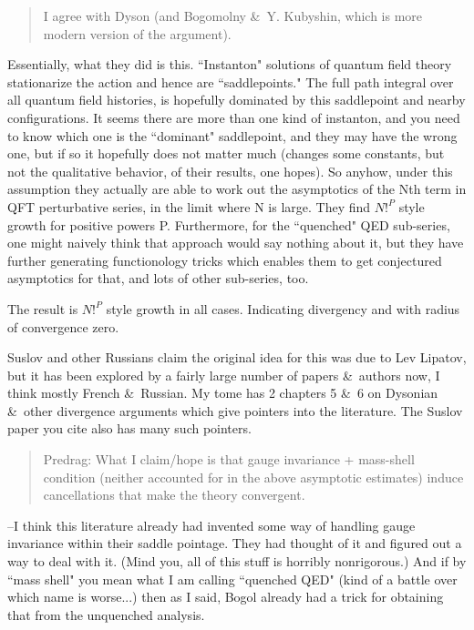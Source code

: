 \begin{description}
\begin{quote}
   I agree with Dyson (and Bogomolny \&\ Y. Kubyshin, which is more
   modern version of the argument).
\end{quote}

Essentially, what they did is this.  ``Instanton" solutions of quantum
field theory stationarize the action and hence are ``saddlepoints."  The
full path integral over all quantum field histories, is hopefully
dominated by this saddlepoint and nearby configurations.  It seems there
are more than one kind of instanton, and you need to know which one is
the ``dominant" saddlepoint, and they may have the wrong one, but if so
it hopefully does not matter much (changes some constants, but not the
qualitative behavior, of their results, one hopes).  So anyhow, under
this assumption they actually are able to work out the asymptotics of the
Nth term in QFT perturbative series, in the limit where N is large.  They
find $N!^P$ style growth for positive powers P.  Furthermore, for the
``quenched" QED sub-series, one might naively think that approach would
say nothing about it, but they have further generating functionology
tricks which enables them to get conjectured asymptotics for that, and
lots of other sub-series, too.

The result is $N!^P$ style growth in all cases.
Indicating divergency and with radius of convergence zero.

Suslov and other Russians claim the original idea for this
was due to Lev Lipatov, but it has been explored by a fairly large number
of papers \&\ authors now, I think mostly French \&\ Russian.  My tome
has 2 chapters 5 \&\ 6 on Dysonian \&\ other divergence arguments which
give pointers into the literature.  The Suslov paper you cite also
has many such pointers.

\begin{quote} Predrag:
   What I claim/hope is that gauge invariance + mass-shell condition (neither
   accounted for in the above asymptotic estimates) induce cancellations that
   make the theory convergent.
\end{quote}

--I think this literature already had invented some way of handling
gauge invariance within their saddle pointage.   They had thought of
it and figured out a way to deal with it.
(Mind you, all of this stuff is horribly nonrigorous.)
And if by ``mass shell" you mean what I am calling ``quenched QED"
(kind of a battle over which name is worse...) then as I said, Bogol
already had a trick
for obtaining that from the unquenched analysis.


\end{description}
